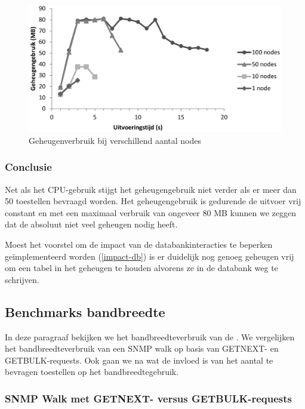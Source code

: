 \begin{figure}[h]
	\centering
	\includegraphics[scale=0.40]{figures/ram-100nodes}
	\caption{Geheugenverbruik bij verschillend aantal nodes}
	\label{fig-ram-aantalnodes}
\end{figure}

\subsubsection{Conclusie}

Net als het CPU-gebruik stijgt het geheugengebruik niet verder als er meer dan 50 toestellen bevraagd worden.
Het geheugengebruik is gedurende de uitvoer vrij constant en met een maximaal verbruik van ongeveer 80 MB kunnen we zeggen dat
de \nwmretriever{} absoluut niet veel geheugen nodig heeft.

Moest het voorstel om de impact van de databankinteracties te beperken geïmplementeerd worden (\cref{impact-db}) is er duidelijk
nog genoeg geheugen vrij om een tabel in het geheugen te houden alvorens ze in de databank weg te schrijven. 


\subsection{Benchmarks bandbreedte}
\label{benchmarks-bandbreedte}

In deze paragraaf bekijken we het bandbreedteverbruik van de \nwmretriever{}.
We vergelijken het bandbreedteverbruik van een SNMP walk op basis van GETNEXT- en GETBULK-requests.
Ook gaan we na wat de invloed is van het aantal te bevragen toestellen op het bandbreedtegebruik.

\subsubsection{SNMP Walk met GETNEXT- versus GETBULK-requests}

